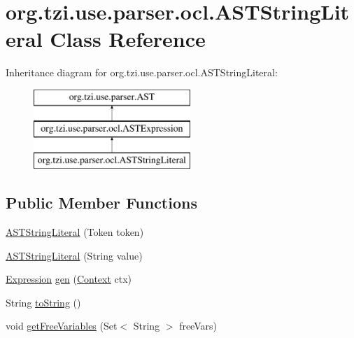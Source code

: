 \hypertarget{classorg_1_1tzi_1_1use_1_1parser_1_1ocl_1_1_a_s_t_string_literal}{\section{org.\-tzi.\-use.\-parser.\-ocl.\-A\-S\-T\-String\-Literal Class Reference}
\label{classorg_1_1tzi_1_1use_1_1parser_1_1ocl_1_1_a_s_t_string_literal}
}
Inheritance diagram for org.\-tzi.\-use.\-parser.\-ocl.\-A\-S\-T\-String\-Literal\-:\begin{figure}[H]
\begin{center}
\leavevmode
\includegraphics[height=3.000000cm]{classorg_1_1tzi_1_1use_1_1parser_1_1ocl_1_1_a_s_t_string_literal}
\end{center}
\end{figure}
\subsection*{Public Member Functions}
\begin{DoxyCompactItemize}
\item 
\hyperlink{classorg_1_1tzi_1_1use_1_1parser_1_1ocl_1_1_a_s_t_string_literal_a7ed3e86c6b86aef639f34cf2bcc283a0}{A\-S\-T\-String\-Literal} (Token token)
\item 
\hyperlink{classorg_1_1tzi_1_1use_1_1parser_1_1ocl_1_1_a_s_t_string_literal_a0765bfae51913f842655fad69e44cecc}{A\-S\-T\-String\-Literal} (String value)
\item 
\hyperlink{classorg_1_1tzi_1_1use_1_1uml_1_1ocl_1_1expr_1_1_expression}{Expression} \hyperlink{classorg_1_1tzi_1_1use_1_1parser_1_1ocl_1_1_a_s_t_string_literal_a586ebb2fc4d0eb1b0b567a99b14804f1}{gen} (\hyperlink{classorg_1_1tzi_1_1use_1_1parser_1_1_context}{Context} ctx)
\item 
String \hyperlink{classorg_1_1tzi_1_1use_1_1parser_1_1ocl_1_1_a_s_t_string_literal_af4513338c3e9f5103895aacb441ecca7}{to\-String} ()
\item 
void \hyperlink{classorg_1_1tzi_1_1use_1_1parser_1_1ocl_1_1_a_s_t_string_literal_a59382867903f3e624cbc66f9bf740a8f}{get\-Free\-Variables} (Set$<$ String $>$ free\-Vars)
\end{DoxyCompactItemize}
